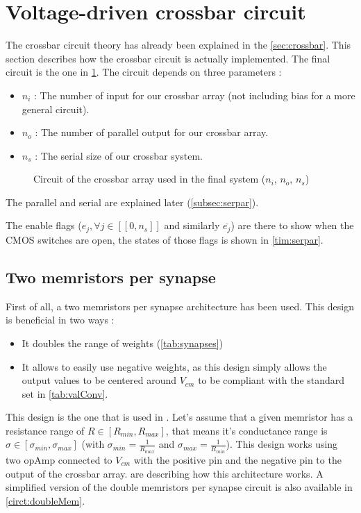 \section{Voltage-driven crossbar circuit}
\label{sec:xbarCircuit}

The crossbar circuit theory has already been explained in the \cref{sec:crossbar}. This section describes how the crossbar circuit is actually implemented. The final circuit is the one in \cref{circt:xbar}. The circuit depends on three parameters :
\begin{itemize}
  \item $n_i$ : The number of input for our crossbar array (not including bias for a more general circuit).
  \item $n_o$ : The number of parallel output for our crossbar array.
  \item $n_s$ : The serial size of our crossbar system.
\end{itemize}

\begin{figure}[H]
  \centering
  
  \caption{Circuit of the crossbar array used in the final system ($n_i$, $n_o$, $n_s$)}
  \label{circt:xbar}
\end{figure}

The parallel and serial are explained later (\cref{subsec:serpar}).

The enable flags ($e_j,\forall j\in[\![ 0,n_s]\!]$ and similarly $\overline{e_j}$) are there to show when the \ac{CMOS} switches are open, the states of those flags is shown in \cref{tim:serpar}.

\subsection{Two memristors per synapse}

First of all, a two memristors per synapse architecture has been used. This design is beneficial in two ways :

\begin{itemize}
  \item It doubles the range of weights (\cref{tab:synapses})
  \item It allows to easily use negative weights, as this design simply allows the output values to be centered around $V_{cm}$ to be compliant with the standard set in \cref{tab:valConv}.
\end{itemize}

This design is the one that is used in \cite{doubleMem}. Let's assume that a given memristor has a resistance range of $R\in[R_{min},R_{max}]$, that means it's conductance range is $\sigma \in [\sigma_{min},\sigma_{max}]$ (with $\sigma_{min}= \frac{1}{R_{max}}$ and $\sigma_{max}= \frac{1}{R_{min}}$). This design works using two \ac{opAmp} connected to $V_{cm}$ with the positive pin and the negative pin to the output of the crossbar array.  are describing how this architecture works. A simplified version of the double memristors per synapse circuit is also available in \cref{circt:doubleMem}.

